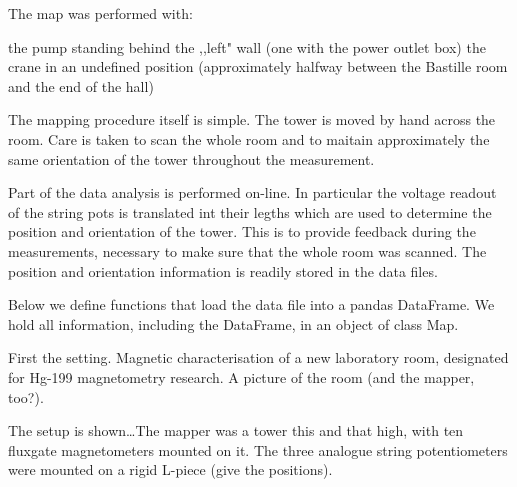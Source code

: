 The map was performed with:

    the pump standing behind the ,,left" wall (one with the power outlet box)
    the crane in an undefined position (approximately halfway between the Bastille room and the end of the hall)

The mapping procedure itself is simple. The tower is moved by hand across the room. Care is taken to scan the whole room and to maitain approximately the same orientation of the tower throughout the measurement.

Part of the data analysis is performed on-line. In particular the voltage readout of the string pots is translated int their legths which are used to determine the position and orientation of the tower. This is to provide feedback during the measurements, necessary to make sure that the whole room was scanned. The position and orientation information is readily stored in the data files.

Below we define functions that load the data file into a pandas DataFrame. We hold all information, including the DataFrame, in an object of class Map.



First the setting. Magnetic characterisation of a new laboratory room, designated for Hg-199 magnetometry research.
A picture of the room (and the mapper, too?).

The setup is shown\ldots The mapper was a tower this and that high, with ten fluxgate magnetometers mounted on it.
The three analogue string potentiometers were mounted on a rigid L-piece (give the positions).

